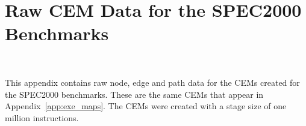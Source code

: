 \chapter{Raw CEM Data for the SPEC2000 Benchmarks}~\label{app:raw_data}

This appendix contains raw node, edge and path data for the CEMs created for the
SPEC2000 benchmarks. These are the same CEMs that appear in
Appendix~\ref{app:exe_maps}. The CEMs were created with a stage size of one
million instructions.


